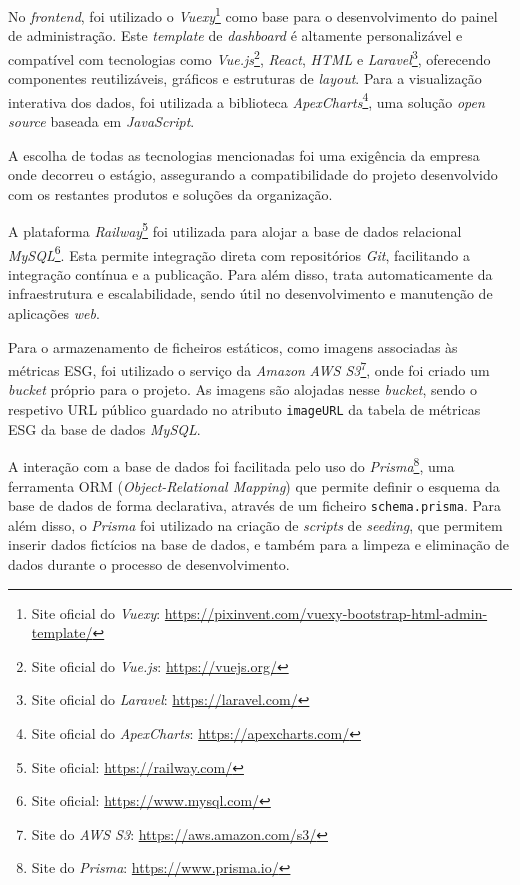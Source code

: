 No \textit{frontend}, foi utilizado o \textit{Vuexy}\footnote{Site oficial do \textit{Vuexy}: \url{https://pixinvent.com/vuexy-bootstrap-html-admin-template/}} como base para o desenvolvimento do painel de administração. Este \textit{template} de \textit{dashboard} é altamente personalizável e compatível com tecnologias como \textit{Vue.js}\footnote{Site oficial do \textit{Vue.js}: \url{https://vuejs.org/}}, \textit{React}, \textit{HTML} e \textit{Laravel}\footnote{Site oficial do \textit{Laravel}: \url{https://laravel.com/}}, oferecendo componentes reutilizáveis, gráficos e estruturas de \textit{layout}. Para a visualização interativa dos dados, foi utilizada a biblioteca \textit{ApexCharts}\footnote{Site oficial do \textit{ApexCharts}: \url{https://apexcharts.com/}}, uma solução \textit{open source} baseada em \textit{JavaScript}.

A escolha de todas as tecnologias mencionadas foi uma exigência da empresa onde decorreu o estágio, assegurando a compatibilidade do projeto desenvolvido com os restantes produtos e soluções da organização.

A plataforma \textit{Railway}\footnote{Site oficial: \url{https://railway.com/}} foi utilizada para alojar a base de dados relacional \textit{MySQL}\footnote{Site oficial: \url{https://www.mysql.com/}}. Esta permite integração direta com repositórios \textit{Git}, facilitando a integração contínua e a publicação. Para além disso, trata automaticamente da infraestrutura e escalabilidade, sendo útil no desenvolvimento e manutenção de aplicações \textit{web}.

Para o armazenamento de ficheiros estáticos, como imagens associadas às métricas ESG, foi utilizado o serviço da \textit{Amazon} \textit{AWS S3}\footnote{Site do \textit{AWS S3}: \url{https://aws.amazon.com/s3/}}, onde foi criado um \textit{bucket} próprio para o projeto. As imagens são alojadas nesse \textit{bucket}, sendo o respetivo URL público guardado no atributo \texttt{imageURL} da tabela de métricas ESG da base de dados \textit{MySQL}. 

A interação com a base de dados foi facilitada pelo uso do \textit{Prisma}\footnote{Site do \textit{Prisma}: \url{https://www.prisma.io/}}, uma ferramenta ORM (\textit{Object-Relational Mapping}) que permite definir o esquema da base de dados de forma declarativa, através de um ficheiro \texttt{schema.prisma}. Para além disso, o \textit{Prisma} foi utilizado na criação de \textit{scripts} de \textit{seeding}, que permitem inserir dados fictícios na base de dados, e também para a limpeza e eliminação de dados durante o processo de desenvolvimento.

